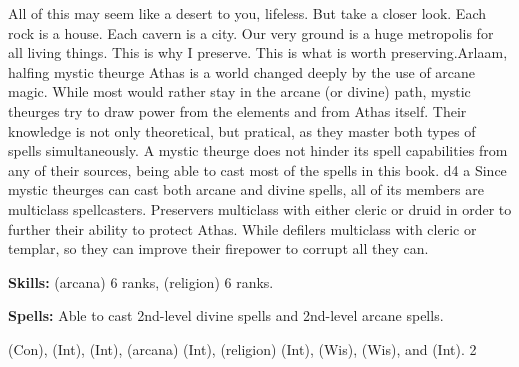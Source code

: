 {All of this may seem like a desert to you, lifeless. But take a closer look. Each rock is a house. Each cavern is a city. Our very ground is a huge metropolis for all living things. This is why I preserve. This is what is worth preserving.}{Arlaam, halfing mystic theurge}
{Athas is a world changed deeply by the use of arcane magic. While most would rather stay in the arcane (or divine) path, mystic theurges try to draw power from the elements and from Athas itself. Their knowledge is not only theoretical, but pratical, as they master both types of spells simultaneously. A mystic theurge does not hinder its spell capabilities from any of their sources, being able to cast most of the spells in this book.}
{d4}
{a}
{Since mystic theurges can cast both arcane and divine spells, all of its members are multiclass spellcasters. Preservers multiclass with either cleric or druid in order to further their ability to protect Athas. While defilers multiclass with cleric or templar, so they can improve their firepower to corrupt all they can.}
{
\textbf{Skills:}  (arcana) 6 ranks,  (religion) 6 ranks.

\textbf{Spells:} Able to cast 2nd-level divine spells and 2nd-level arcane spells.
}
{
 (Con),  (Int),  (Int),  (arcana) (Int),  (religion) (Int),  (Wis),  (Wis), and  (Int).
}
{2}
